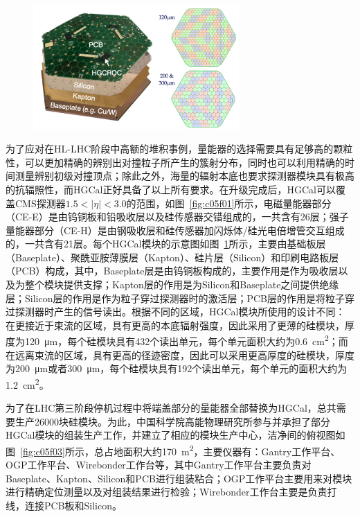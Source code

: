 \begin{figure}[!htbp]
    \centering
    \includegraphics[width=0.7\textwidth]{figures/chapter05/HGCal_layers.jpg}
    \label{fig:c05f02}
\end{figure}

为了应对在HL-LHC阶段中高额的堆积事例，量能器的选择需要具有足够高的颗粒性，可以更加精确的辨别出对撞粒子所产生的簇射分布，同时也可以利用精确的时间测量辨别初级对撞顶点；除此之外，海量的辐射本底也要求探测器模块具有极高的抗辐照性，而HGCal正好具备了以上所有要求。在升级完成后，HGCal可以覆盖CMS探测器$1.5<|\eta|<3.0$的范围，如图~\ref{fig:c05f01}所示，电磁量能器部分（CE-E）是由钨铜板和铅吸收层以及硅传感器交错组成的，一共含有26层；强子量能器部分（CE-H）是由钢吸收层和硅传感器加闪烁体/硅光电倍增管交互组成的，一共含有21层。每个HGCal模块的示意图如图~\ref{fig:c05f02}所示，主要由基础板层（Baseplate）、聚酰亚胺薄膜层（Kapton）、硅片层（Silicon）和印刷电路板层（PCB）构成，其中，Baseplate层是由钨铜板构成的，主要作用是作为吸收层以及为整个模块提供支撑；Kapton层的作用是为Silicon和Baseplate之间提供绝缘层；Silicon层的作用是作为粒子穿过探测器时的激活层；PCB层的作用是将粒子穿过探测器时产生的信号读出。根据不同的区域，HGCal模块所使用的设计不同：在更接近于束流的区域，具有更高的本底辐射强度，因此采用了更薄的硅模块，厚度为120~\si{\um}，每个硅模块具有432个读出单元，每个单元面积大约为0.6~\si{\cm^{2}}；而在远离束流的区域，具有更高的径迹密度，因此可以采用更高厚度的硅模块，厚度为200~\si{\um}或者300~\si{\um}，每个硅模块具有192个读出单元，每个单元的面积大约为1.2~\si{\cm^{2}}。

为了在LHC第三阶段停机过程中将端盖部分的量能器全部替换为HGCal，总共需要生产26000块硅模块。为此，中国科学院高能物理研究所参与并承担了部分HGCal模块的组装生产工作，并建立了相应的模块生产中心，洁净间的俯视图如图~\ref{fig:c05f03}所示，总占地面积大约170~\si{\m^{2}}，主要仪器有：Gantry工作平台、OGP工作平台、Wirebonder工作台等，其中Gantry工作平台主要负责对Baseplate、Kapton、Silicon和PCB进行组装粘合；OGP工作平台主要用来对模块进行精确定位测量以及对组装结果进行检验；Wirebonder工作台主要是负责打线，连接PCB板和Silicon。


